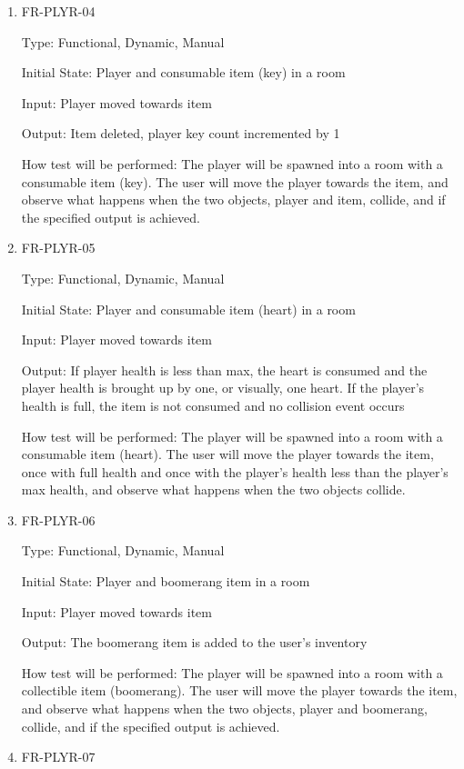 \documentclass[12pt, titlepage]{article}
\begin{document}
\begin{enumerate}
\item{FR-PLYR-04\\}

Type: Functional, Dynamic, Manual

Initial State: Player and consumable item (key) in a room

Input: Player moved towards item

Output: Item deleted, player key count incremented by 1

How test will be performed: The player will be spawned into a room with a consumable item (key). The user will move the player towards the item, and observe what happens when the two objects, player and item, collide, and if the specified output is achieved.

\item{FR-PLYR-05\\}

Type: Functional, Dynamic, Manual

Initial State: Player and consumable item (heart) in a room

Input: Player moved towards item

Output: If player health is less than max, the heart is consumed and the player health is brought up by one, or visually, one heart. If the player's health is full, the item is not consumed and no collision event occurs

How test will be performed: The player will be spawned into a room with a consumable item (heart). The user will move the player towards the item, once with full health and once with the player's health less than the player's max health, and observe what happens when the two objects collide.

\item{FR-PLYR-06\\}

Type: Functional, Dynamic, Manual

Initial State: Player and boomerang item in a room

Input: Player moved towards item

Output: The boomerang item is added to the user's inventory

How test will be performed: The player will be spawned into a room with a collectible item (boomerang). The user will move the player towards the item, and observe what happens when the two objects, player and boomerang, collide, and if the specified output is achieved.

\item{FR-PLYR-07\\}


\end{enumerate}
\end{document}
